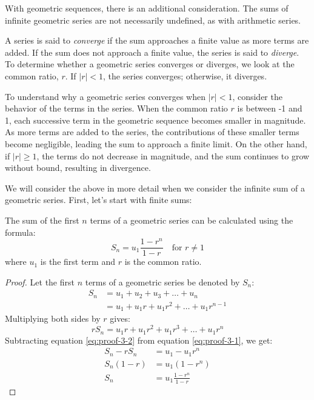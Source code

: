 With geometric sequences, there is an additional consideration. The sums of infinite geometric 
series are not necessarily undefined, as with arithmetic series. 

\begin{definition}[Convergence]
	A series is said to \textit{converge} if the sum approaches a finite value as more terms are added. 
	If the sum does not approach a finite value, the series is said to \textit{diverge}. To determine 
	whether a geometric series converges or diverges, we look at the common ratio, $r$. If $|r| < 1$, the series converges; 
	otherwise, it diverges.
\end{definition}

\begin{intuition}
	To understand why a geometric series converges when $|r| < 1$, consider the behavior of the terms in the series. 
	When the common ratio $r$ is between -1 and 1, each successive term in the geometric sequence becomes smaller in magnitude. 
	As more terms are added to the series, the contributions of these smaller terms become negligible, leading the sum to approach a finite limit.
	On the other hand, if $|r| \geq 1$, the terms do not decrease in magnitude, and the sum continues to grow without bound, resulting in divergence.
\end{intuition}

We will consider the above in more detail when we consider the infinite sum of a geometric
series. First, let's start with finite sums:

\begin{proposition}
	The sum of the first $n$ terms of a geometric series can be calculated using the formula:
	\begin{equation}
		S_n = u_1 \frac{1 - r^n}{1 - r} \quad \text{for } r \neq 1
	\end{equation}
	where $u_1$ is the first term and $r$ is the common ratio.
\end{proposition}
\begin{proof}
	Let the first $n$ terms of a geometric series be denoted by $S_n$:
	\begin{align}
		S_n &= u_1 + u_2 + u_3 + \ldots + u_n \\
		&= u_1 + u_1 r + u_1 r^2 + \ldots + u_1 r^{n-1}\label{eq:proof-3-1}
	\end{align}
	Multiplying both sides by $r$ gives:
	\begin{equation}\label{eq:proof-3-2}
		r S_n = u_1 r + u_1 r^2 + u_1 r^3 + \ldots + u_1 r^n
	\end{equation}
	Subtracting equation \eqref{eq:proof-3-2} from equation \eqref{eq:proof-3-1}, we get:
	\begin{align*}
		S_n - r S_n &= u_1 - u_1 r^n \\
		S_n (1 - r) &= u_1 (1 - r^n) \\
		S_n &= u_1 \frac{1 - r^n}{1 - r}
	\end{align*}
\end{proof}

